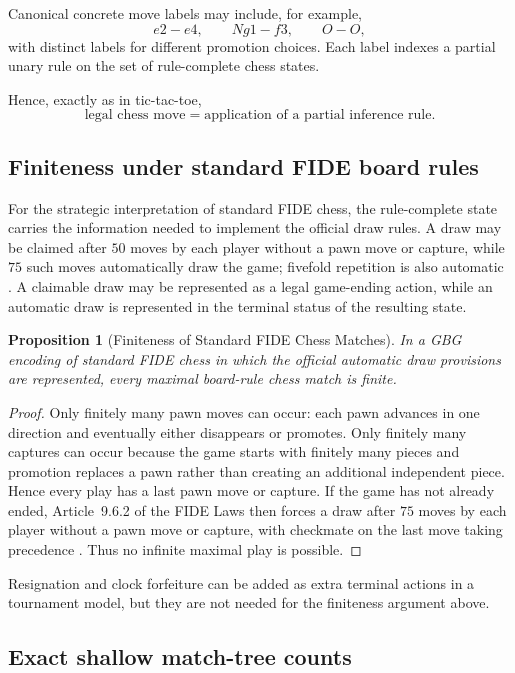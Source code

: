\documentclass[11pt]{article}
\newtheorem{proposition}[theorem]{Proposition}
\theoremstyle{definition}
\theoremstyle{remark}
\begin{document}
Canonical concrete move labels may include, for example,
\[
e2-e4,
\qquad Ng1-f3,
\qquad O-O,
\]
with distinct labels for different promotion choices. Each label indexes a partial unary rule on the set of rule-complete chess states.

Hence, exactly as in tic-tac-toe,
\[
\boxed{\text{legal chess move}=\text{application of a partial inference rule}.}
\]

\subsection{Finiteness under standard FIDE board rules}

For the strategic interpretation of standard FIDE chess, the rule-complete state carries the information needed to implement the official draw rules. A draw may be claimed after $50$ moves by each player without a pawn move or capture, while $75$ such moves automatically draw the game; fivefold repetition is also automatic \cite{FIDE2023}. A claimable draw may be represented as a legal game-ending action, while an automatic draw is represented in the terminal status of the resulting state.

\begin{proposition}[Finiteness of Standard FIDE Chess Matches]
In a GBG encoding of standard FIDE chess in which the official automatic draw provisions are represented, every maximal board-rule chess match is finite.
\end{proposition}

\begin{proof}
Only finitely many pawn moves can occur: each pawn advances in one direction and eventually either disappears or promotes. Only finitely many captures can occur because the game starts with finitely many pieces and promotion replaces a pawn rather than creating an additional independent piece. Hence every play has a last pawn move or capture. If the game has not already ended, Article~9.6.2 of the FIDE Laws then forces a draw after $75$ moves by each player without a pawn move or capture, with checkmate on the last move taking precedence \cite{FIDE2023}. Thus no infinite maximal play is possible.
\end{proof}

Resignation and clock forfeiture can be added as extra terminal actions in a tournament model, but they are not needed for the finiteness argument above.

\subsection{Exact shallow match-tree counts}
\end{document}
